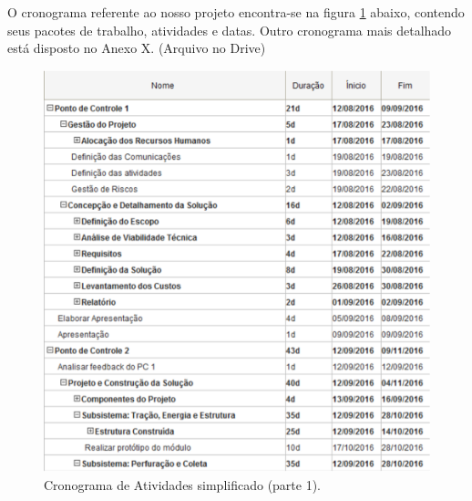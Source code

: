      O cronograma referente ao nosso projeto encontra-se na figura \ref{fig:cron_s1}
      abaixo, contendo seus pacotes de trabalho, atividades e datas. Outro
      cronograma mais detalhado está disposto no Anexo X. (Arquivo no Drive)

      \begin{figure}[!htbp]
      \begin{center}
      \includegraphics[width=\textwidth]{figuras/cronograma_simples_1.eps}
      \caption{\label{fig:cron_s1}Cronograma de Atividades simplificado (parte 1).}
      \end{center}
      \end{figure}

